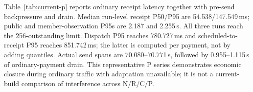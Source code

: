 Table~\ref{tab:current-p} reports ordinary receipt latency together
with pre-send backpressure and drain. Median run-level receipt
P50/P95 are 54.538/147.549\,ms; public and member-observation P95s
are 2.187 and 2.255\,s. All three runs reach the 256-outstanding
limit. Dispatch P95 reaches 780.727\,ms and scheduled-to-receipt
P95 reaches 851.742\,ms; the latter is computed per payment,
not by adding quantiles. Actual send spans are 70.080--70.771\,s,
followed by 0.955--1.115\,s of ordinary-payment drain. This
representative P series demonstrates economic closure during
ordinary traffic with adaptation unavailable; it is not a
current-build comparison of interference across N/R/C/P.